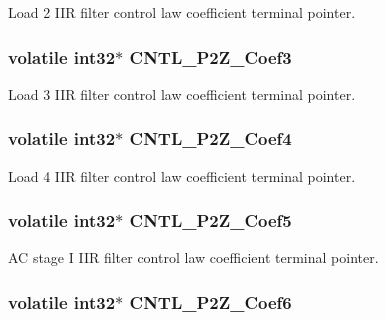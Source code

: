 Load 2 I\-I\-R filter control law coefficient terminal pointer. \hypertarget{a00014_a1e357d296e76299ea04d7a63e4c46d1b}{
\subsubsection[{C\-N\-T\-L\-\_\-2\-P2\-Z\-\_\-\-Coef3}]{\setlength{\rightskip}{0pt plus 5cm}volatile int32$\ast$ C\-N\-T\-L\-\_\-P2\-Z\-\_\-\-Coef3}}\label{a00014_a1e357d296e76299ea04d7a63e4c46d1b}
Load 3 I\-I\-R filter control law coefficient terminal pointer. \hypertarget{a00014_afe468cb1e995b267671e88b8d292aef6}{
\subsubsection[{C\-N\-T\-L\-\_\-2\-P2\-Z\-\_\-\-Coef4}]{\setlength{\rightskip}{0pt plus 5cm}volatile int32$\ast$ C\-N\-T\-L\-\_\-P2\-Z\-\_\-\-Coef4}}\label{a00014_afe468cb1e995b267671e88b8d292aef6}
Load 4 I\-I\-R filter control law coefficient terminal pointer. \hypertarget{a00014_a5fe3f4dd6aac27512c9e0b6fc843b0b6}{
\subsubsection[{C\-N\-T\-L\-\_\-2\-P2\-Z\-\_\-\-Coef5}]{\setlength{\rightskip}{0pt plus 5cm}volatile int32$\ast$ C\-N\-T\-L\-\_\-P2\-Z\-\_\-\-Coef5}}\label{a00014_a5fe3f4dd6aac27512c9e0b6fc843b0b6}
A\-C stage I I\-I\-R filter control law coefficient terminal pointer. \hypertarget{a00014_ac7b2d6195e1c497429235d54ebbd9087}{
\subsubsection[{C\-N\-T\-L\-\_\-2\-P2\-Z\-\_\-\-Coef6}]{\setlength{\rightskip}{0pt plus 5cm}volatile int32$\ast$ C\-N\-T\-L\-\_\-P2\-Z\-\_\-\-Coef6}}\label{a00014_ac7b2d6195e1c497429235d54ebbd9087}
